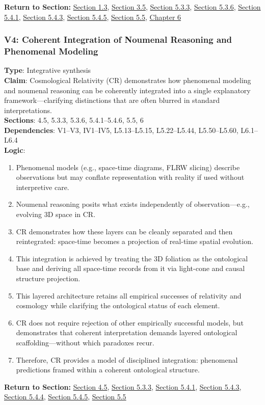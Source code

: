 \documentclass[12pt]{book}
\begin{document}
\textbf{Return to Section:} \hyperref[sec:1.3]{Section 1.3}, \hyperref[sec:3.5]{Section 3.5}, \hyperref[sec:5.3.3]{Section 5.3.3}, \hyperref[sec:5.3.6]{Section 5.3.6}, \hyperref[sec:5.4.1]{Section 5.4.1}, \hyperref[sec:5.4.3]{Section 5.4.3}, \hyperref[sec:5.4.5]{Section 5.4.5}, \hyperref[sec:5.5]{Section 5.5}, \hyperref[sec:6]{Chapter 6}

\subsubsection*{V4: Coherent Integration of Noumenal Reasoning and Phenomenal Modeling}
\label{appendix:V4}
\textbf{Type}: Integrative synthesis \\
\textbf{Claim}: Cosmological Relativity (CR) demonstrates how phenomenal modeling and noumenal reasoning can be coherently integrated into a single explanatory framework---clarifying distinctions that are often blurred in standard interpretations. \\
\textbf{Sections}: 4.5, 5.3.3, 5.3.6, 5.4.1–5.4.6, 5.5, 6 \\
\textbf{Dependencies}: V1–V3, IV1–IV5, L5.13–L5.15, L5.22–L5.44, L5.50–L5.60, L6.1–L6.4 \\
\textbf{Logic}:
\begin{enumerate}
    \item Phenomenal models (e.g., space-time diagrams, FLRW slicing) describe observations but may conflate representation with reality if used without interpretive care.
    \item Noumenal reasoning posits what exists independently of observation---e.g., evolving 3D space in CR.
    \item CR demonstrates how these layers can be cleanly separated and then reintegrated: space-time becomes a projection of real-time spatial evolution.
    \item This integration is achieved by treating the 3D foliation as the ontological base and deriving all space-time records from it via light-cone and causal structure projection.
    \item This layered architecture retains all empirical successes of relativity and cosmology while clarifying the ontological status of each element.
    \item CR does not require rejection of other empirically successful models, but demonstrates that coherent interpretation demands layered ontological scaffolding---without which paradoxes recur.
    \item Therefore, CR provides a model of disciplined integration: phenomenal predictions framed within a coherent ontological structure.
\end{enumerate}
\textbf{Return to Section:} \hyperref[sec:4.5]{Section 4.5}, \hyperref[sec:5.3.3]{Section 5.3.3}, \hyperref[sec:5.4.1]{Section 5.4.1}, \hyperref[sec:5.4.3]{Section 5.4.3}, \hyperref[sec:5.4.4]{Section 5.4.4}, \hyperref[sec:5.4.5]{Section 5.4.5}, \hyperref[sec:5.5]{Section 5.5}
\end{document}
